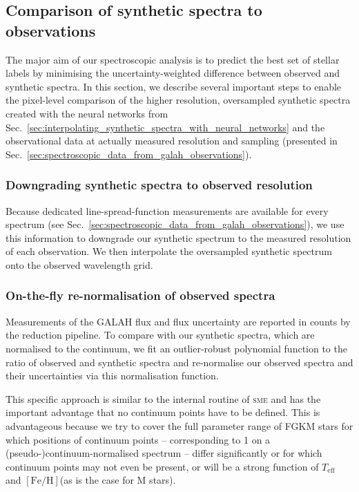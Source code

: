 \documentclass[
  journal=pasa,
  manuscript=research-paper, %
  year=2024,
  volume=37
]{cup-journal}
\newcommand{\Teff}{$T_\mathrm{eff}$\xspace}
\newcommand{\feh}{$\mathrm{[Fe/H]}$\xspace}
\newcommand{\sme}{\textsc{sme}\xspace}
\begin{document}
\subsection{Comparison of synthetic spectra to observations}
\label{sec:comparison_synthetic_spectra_to_observations}

The major aim of our spectroscopic analysis is to predict the best set of stellar labels by minimising the uncertainty-weighted difference between observed and synthetic spectra. In this section, we describe several important steps to enable the pixel-level comparison of the higher resolution, oversampled synthetic spectra created with the neural networks from Sec.~\ref{sec:interpolating_synthetic_spectra_with_neural_networks} and the observational data at actually measured resolution and sampling (presented in Sec.~\ref{sec:spectroscopic_data_from_galah_observations}).

\subsubsection{Downgrading synthetic spectra to observed resolution}

Because dedicated line-spread-function measurements are available for every spectrum (see Sec.~\ref{sec:spectroscopic_data_from_galah_observations}), we use this information to downgrade our synthetic spectrum to the measured resolution of each observation. We then interpolate the oversampled synthetic spectrum onto the observed wavelength grid.

\subsubsection{On-the-fly re-normalisation of observed spectra}

Measurements of the GALAH flux and flux uncertainty are reported in counts by the reduction pipeline. To compare with our synthetic spectra, which are normalised to the continuum, we fit an outlier-robust polynomial function to the ratio of observed and synthetic spectra and re-normalise our observed spectra and their uncertainties via this normalisation function.

This specific approach is similar to the internal routine of \sme and has the important advantage that no continuum points have to be defined. This is advantageous because we try to cover the full parameter range of FGKM stars for which positions of continuum points -- corresponding to 1 on a (pseudo-)continuum-normalised spectrum -- differ significantly or for which continuum points may not even be present, or will be a strong function of \Teff and \feh (as is the case for M stars).
\end{document}
